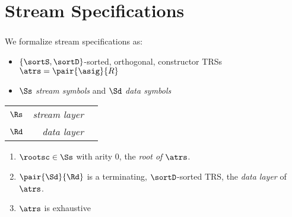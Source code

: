 \documentclass[10pt]{beamer}
\begin{document}
\section{Stream Specifications}



\begin{frame}%
  \frametitle{}%

We formalize stream specifications as:
\begin{itemize}
 \item $\{\sortS,\sortD\}$-sorted, orthogonal, constructor TRSs $\atrs = \pair{\asig}{R}$
 \item $\Ss$ \emph{stream symbols} and $\Sd$ \emph{data symbols}
\end{itemize}

\begin{definition}
  \begin{center}
  \renewcommand{\arraystretch}{1.3}
  \begin{tabular}{crc}
    \cline{1-2}
    $\Rs$ & {\em stream layer}\\
      \cline{1-2}
    $\Rd$ & {\em data layer}\\
    \cline{1-2}
  \end{tabular}
  \end{center}
  \begin{enumerate}
    \item $\rootsc \in \Ss$ with arity 0, the \emph{root of\/ $\atrs$}.
    \item\label{def:scs:data}
       $\pair{\Sd}{\Rd}$ is a terminating, $\sortD$-sorted TRS, the \emph{data layer} of\/ $\atrs$.
    \item\label{def:scs:exhaustive}
      $\atrs$ is exhaustive%
  \end{enumerate}
\end{definition}


 
\end{frame}%
\end{document}
